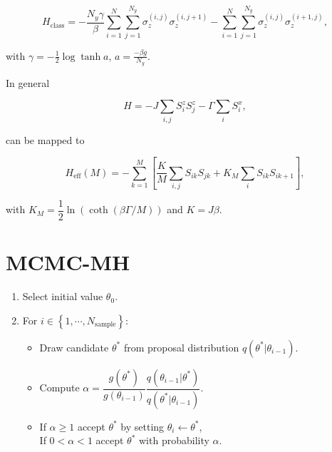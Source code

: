 \documentclass[11pt,openany]{article}
\begin{document}
\begin{equation}
	H_\mathrm{class} = -\frac{N_y\gamma}{\beta}\sum_{i=1}^N\sum_{j=1}^{N_y}\sigma_z^{(i,j)}\sigma_z^{(i,j+1)} - \sum_{i=1}^N\sum_{j=1}^{N_y}\sigma_z^{(i,j)}\sigma_z^{(i+1,j)},
\end{equation}

with $\gamma = -\frac{1}{2}\log\tanh{a}$, $a = \frac{-\beta g}{N_y}$.

In general

\begin{equation}
	H = -J\sum_{i,j}S_i^zS_j^z - \Gamma\sum_iS_i^x,
\end{equation}

can be mapped to

\begin{equation}
	H_\mathrm{eff}(M) = -\sum_{k=1}^M\left[\frac{K}{M}\sum_{i,j}S_{ik}S_{jk} + K_M\sum_iS_{ik}S_{ik+1}\right],
\end{equation}

with $K_M = \dfrac{1}{2}\ln\left(\coth\left(\beta\Gamma/M\right)\right)$ and $K=J\beta$.

\section{MCMC-MH}


\begin{tcolorbox}[title=Metropolis-Hasting algorithm]
	
	\begin{enumerate}
		
		\item Select initial value $\theta_0$.
		
		\item For $i\in\left\{1,\cdots,N_\mathrm{sample}\right\}$:
			\begin{itemize}
				\item Draw candidate $\theta^*$ from proposal distribution $q(\theta^*|\theta_{i-1})$.
				
				\item Compute $\alpha = \dfrac{g(\theta^*)}{g(\theta_{i-1})}\dfrac{q(\theta_{i-1}|\theta^*)}{q(\theta^*|\theta_{i-1})}$.
				
				\item If $\alpha \geq 1$ accept $\theta^*$ by setting $\theta_i\leftarrow\theta^*$,\\
				If $0 < \alpha <1$ accept $\theta^*$ with probability $\alpha$.
			\end{itemize}
		
	\end{enumerate}
	
\end{tcolorbox}




	
\end{document}
